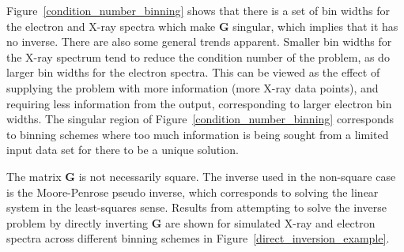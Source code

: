 Figure~\ref{condition_number_binning} shows that there is a set of bin widths for the electron and X-ray spectra which make $\mathbf{G}$ singular, which implies that it has no inverse. There are also some general trends apparent. Smaller bin widths for the X-ray spectrum tend to reduce the condition number of the problem, as do larger bin widths for the electron spectra. This can be viewed as the effect of supplying the problem with more information (more X-ray data points), and requiring less information from the output, corresponding to larger electron bin widths. The singular region of Figure~\ref{condition_number_binning} corresponds to binning schemes where too much information is being sought from a limited input data set for there to be a unique solution.

The matrix $\mathbf{G}$ is not necessarily square. The inverse used in the non-square case is the Moore-Penrose pseudo inverse, which corresponds to solving the linear system in the least-squares sense. Results from attempting to solve the inverse problem by directly inverting $\mathbf{G}$ are shown for simulated X-ray and electron spectra across different binning schemes in Figure~\ref{direct_inversion_example}.

